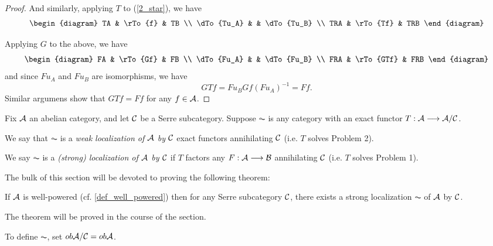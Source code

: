 \begin{proof}
And similarly, applying $T$ to (\ref{2_star}), we have
\[
\begin{diagram}
TA         & \rTo{f}  & TB         \\
\dTo{Tu_A} &          & \dTo{Tu_B} \\
TRA        & \rTo{Tf} & TRB
\end{diagram}
\]

Applying $G$ to the above, we have
\[
\begin{diagram}
FA         & \rTo{Gf}  & FB         \\
\dTo{Fu_A} &           & \dTo{Fu_B} \\
FRA        & \rTo{GTf} & FRB
\end{diagram}
\]
and since $Fu_A$ and $Fu_B$ are isomorphisms, we have 
\[
GTf = Fu_BGf(Fu_A)^{-1} = Ff.
\]
Similar argumens show that $GTf = Ff$
for any $f \in \mathcal{A}$.
\end{proof}

\begin{definition}
Fix $\mathcal{A}$ an abelian category, and let $\mathcal{C}$ be a Serre
subcategory. Suppose $\AC$ is any category with an exact functor 
$T: \mathcal{A} \longrightarrow \mathcal{A}/\mathcal{C}$. 

We say that $\AC$ is a \emph{weak localization of $\mathcal{A}$ by 
$\mathcal{C}$} exact functors annihilating $\mathcal{C}$ (i.e. $T$ solves 
Problem 2).

We say $\AC$ is a \emph{(strong) localization of $\mathcal{A}$ by 
$\mathcal{C}$} if $T$ factors any $F: \mathcal{A} \longrightarrow \mathcal{B}$ 
annihilating $\mathcal{C}$ (i.e. $T$ solves Problem 1).
\end{definition}

The bulk of this section will be devoted to proving the following
theorem:

\begin{thm}[Serre]
If $\mathcal{A}$ is well-powered (cf. \ref{def_well_powered}) then
for any Serre subcategory $\mathcal{C}$, there exists a strong 
localization $\AC$ of $\mathcal{A}$ by $\mathcal{C}$.
\end{thm}

The theorem will be proved in the course of the section.

To define $\AC$, set $ob \mathcal{A}/\mathcal{C} = ob \mathcal{A}$. 

